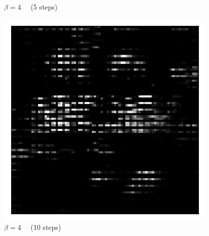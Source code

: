 \begin{figure}[h!]
\begin{multicols}{4}
    \caption{$\beta=4\quad$ (5 steps)}
    \includegraphics[scale=0.4]{figures/results/naive_average/beta_4_posterior_sample_10.png}
    \caption{$\beta=4\quad$ (10 steps)}
\end{multicols}


\end{figure}
